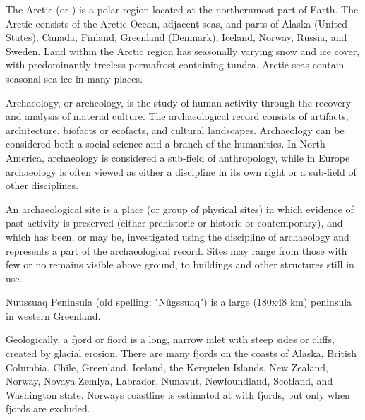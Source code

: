 \documentclass{article} \usepackage{iclr2019_conference,times}
\begin{document}
The Arctic (or ) is a polar region located at the northernmost part of Earth. The Arctic consists of the Arctic Ocean, adjacent seas, and parts of Alaska (United States), Canada, Finland, Greenland (Denmark), Iceland, Norway, Russia, and Sweden. Land within the Arctic region has seasonally varying snow and ice cover, with predominantly treeless permafrost-containing tundra. Arctic seas contain seasonal sea ice in many places.

Archaeology, or archeology, is the study of human activity through the recovery and analysis of material culture. The archaeological record consists of artifacts, architecture, biofacts or ecofacts, and cultural landscapes. Archaeology can be considered both a social science and a branch of the humanities. In North America, archaeology is considered a sub-field of anthropology, while in Europe archaeology is often viewed as either a discipline in its own right or a sub-field of other disciplines.

An archaeological site is a place (or group of physical sites) in which evidence of past activity is preserved (either prehistoric or historic or contemporary), and which has been, or may be, investigated using the discipline of archaeology and represents a part of the archaeological record. Sites may range from those with few or no remains visible above ground, to buildings and other structures still in use.

Nuussuaq Peninsula (old spelling: "Nûgssuaq") is a large (180x48 km) peninsula in western Greenland.

Geologically, a fjord or fiord is a long, narrow inlet with steep sides or cliffs, created by glacial erosion. There are many fjords on the coasts of Alaska, British Columbia, Chile, Greenland, Iceland, the Kerguelen Islands, New Zealand, Norway, Novaya Zemlya, Labrador, Nunavut, Newfoundland, Scotland, and Washington state. Norways coastline is estimated at with fjords, but only when fjords are excluded.
\end{document}

